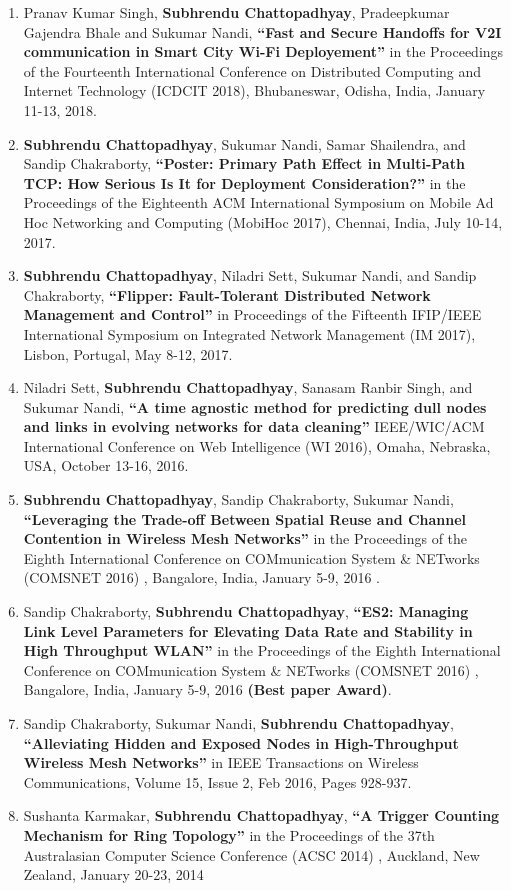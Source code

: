 \documentclass{res}
\newcommand{\papertitle}[1]{\textbf{ ``#1''}}
\newcommand{\authorMe}{{\bf Subhrendu Chattopadhyay}}
\begin{document}
\begin{resume}
\begin{enumerate}
		\item Pranav Kumar Singh, \authorMe, Pradeepkumar Gajendra Bhale and Sukumar Nandi, \papertitle{Fast and Secure Handoffs for V2I communication in Smart City Wi-Fi Deployement} in the Proceedings of the Fourteenth International Conference on Distributed Computing and Internet Technology (ICDCIT 2018), Bhubaneswar, Odisha, India, January 11-13, 2018. 
		\item \authorMe, Sukumar Nandi, Samar Shailendra, and Sandip Chakraborty,\papertitle{Poster: Primary Path Effect in Multi-Path TCP: How Serious Is It for Deployment Consideration?} in the Proceedings of the Eighteenth ACM International Symposium on Mobile Ad Hoc Networking and Computing (MobiHoc 2017), Chennai, India, July 10-14, 2017. 
		\item \authorMe, Niladri Sett, Sukumar Nandi, and Sandip Chakraborty,\papertitle{Flipper: Fault-Tolerant Distributed Network Management and Control} in Proceedings of the Fifteenth IFIP/IEEE International Symposium on Integrated Network Management (IM 2017), Lisbon, Portugal, May 8-12, 2017. 
		\item 	Niladri Sett, \authorMe, Sanasam Ranbir Singh, and Sukumar Nandi, \papertitle{A time agnostic method for predicting dull nodes and links in evolving networks for data cleaning} IEEE/WIC/ACM International Conference on Web Intelligence (WI 2016), Omaha, Nebraska, USA, October 13-16, 2016. 
		\item \authorMe, Sandip Chakraborty, Sukumar Nandi, \papertitle{Leveraging the Trade-off Between Spatial Reuse and Channel Contention in Wireless Mesh Networks} in the Proceedings of the Eighth International Conference on COMmunication System \& NETworks {(COMSNET 2016)} , Bangalore, India, January 5-9, 2016 .
		\item Sandip Chakraborty, \authorMe, \papertitle{ES2: Managing Link Level Parameters for Elevating Data Rate and Stability in High Throughput WLAN} in the Proceedings of the Eighth International Conference on COMmunication System \& NETworks {(COMSNET 2016)} , Bangalore, India, January 5-9, 2016 {\bf (Best paper Award)}.
		\item Sandip Chakraborty, Sukumar Nandi, \authorMe, \papertitle{Alleviating Hidden and Exposed Nodes in High-Throughput Wireless Mesh Networks} in IEEE Transactions on Wireless Communications, Volume 15, Issue 2, Feb 2016, Pages 928-937.
		\item Sushanta Karmakar, \authorMe,  \papertitle{A Trigger Counting Mechanism for Ring Topology}  in the Proceedings of the 37th Australasian Computer Science Conference (ACSC 2014) , Auckland, New Zealand, January 20-23, 2014

\end{enumerate}
\end{resume}
\end{document}

